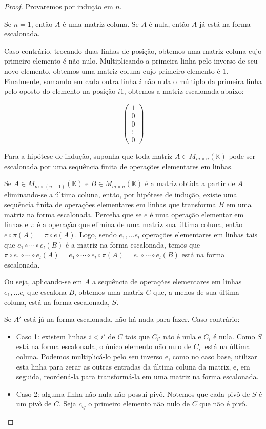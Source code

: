 \begin{proof}
    Provaremos por indução em $n$.

    Se $n=1$, então $A$ é uma matriz coluna.
    Se $A$ é nula, então $A$ já está na forma escalonada.

    Caso contrário, trocando duas linhas de posição, obtemos uma matriz coluna cujo primeiro elemento é não nulo.
    Multiplicando a primeira linha pelo inverso de seu novo elemento, obtemos uma matriz coluna cujo primeiro elemento é $1$.
    Finalmente, somando em cada outra linha $i$ não nula o múltiplo da primeira linha pelo oposto do elemento na posição $i1$, obtemos a matriz escalonada abaixo:

    \begin{equation*}
        \begin{pmatrix}
            1 \\
            0 \\
            0 \\
            \vdots \\
            0
        \end{pmatrix}
    \end{equation*}

Para a hipótese de indução, suponha que toda matriz $A \in M_{m \times n}(\mathbb K)$ pode ser escalonada por uma sequência finita de operações elementares em linhas.

Se $A \in M_{m \times (n+1)}(\mathbb K)$ e $B \in M_{m \times n}(\mathbb K)$ é a matriz obtida a partir de $A$ eliminando-se a última coluna, então, por hipótese de indução, existe uma sequência finita de operações elementares em linhas que transforma $B$ em uma matriz na forma escalonada.
Perceba que se $e$ é uma operação elementar em linhas e $\pi$ é a operação que elimina de uma matriz sua última coluna, então $e\circ \pi(A)=\pi\circ e(A)$.
Logo, sendo $e_1, \dots e_l$ operações elementares em linhas tais que $e_1\circ \cdots \circ e_l(B)$ é a matriz na forma escalonada, temos que $\pi\circ e_1\circ \cdots \circ e_l(A)=e_1\circ \cdots \circ e_l\circ \pi(A)=e_1\circ \cdots \circ e_l(B)$ está na forma escalonada.

Ou seja, aplicando-se em $A$ a sequência de operações elementares em linhas $e_1, \dots e_l$ que escalona $B$, obtemos uma matriz $C$ que, a menos de sua última coluna, está na forma escalonada, $S$.

Se $A'$ está já na forma escalonada, não há nada para fazer. Caso contrário:

\begin{itemize}
    \item Caso 1: existem linhas $i<i'$ de $C$ tais que $C_{i'}$ não é nula e $C_i$ é nula. Como $S$ está na forma escalonada, o único elemento não nulo de $C_{i'}$ está na última coluna.
    Podemos multiplicá-lo pelo seu inverso e, como no caso base, utilizar esta linha para zerar as outras entradas da última coluna da matriz, e, em seguida, reordená-la para transformá-la em uma matriz na forma escalonada.
    \item Caso 2: alguma linha não nula não possui pivô. Notemos que cada pivô de $S$ é um pivô de $C$.
    Seja $c_{ij}$ o primeiro elemento não nulo de $C$ que não é pivô.


\end{itemize}
\end{proof}
